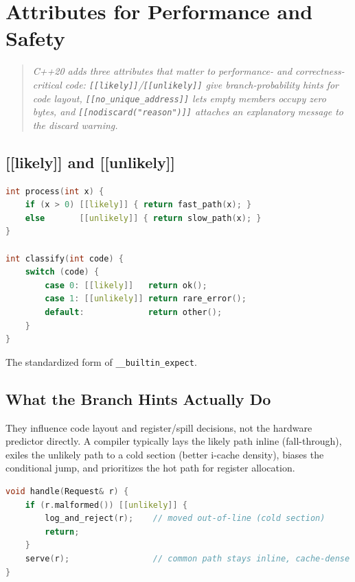 \chapter{Attributes for Performance and Safety}
\label{ch:c20-attributes}

\begin{quote}
\emph{C++20 adds three attributes that matter to performance- and correctness-critical code: \texttt{[[likely]]}/\texttt{[[unlikely]]} give branch-probability hints for code layout, \texttt{[[no\_unique\_address]]} lets empty members occupy zero bytes, and \texttt{[[nodiscard("reason")]]} attaches an explanatory message to the discard warning.}
\end{quote}

\section{[[likely]] and [[unlikely]]}
\label{sec:c20-likely}

\begin{lstlisting}[language=C++,caption={Branch-probability hints on if/else and switch}]
int process(int x) {
    if (x > 0) [[likely]] { return fast_path(x); }
    else       [[unlikely]] { return slow_path(x); }
}

int classify(int code) {
    switch (code) {
        case 0: [[likely]]   return ok();
        case 1: [[unlikely]] return rare_error();
        default:             return other();
    }
}
\end{lstlisting}

The standardized form of \texttt{\_\_builtin\_expect}.

\section{What the Branch Hints Actually Do}
\label{sec:c20-branch-hints-effect}

They influence code layout and register/spill decisions, not the hardware predictor directly. A compiler typically lays the likely path inline (fall-through), exiles the unlikely path to a cold section (better i-cache density), biases the conditional jump, and prioritizes the hot path for register allocation.

\begin{lstlisting}[language=C++,caption={The mental model --- cold paths get exiled}]
void handle(Request& r) {
    if (r.malformed()) [[unlikely]] {
        log_and_reject(r);    // moved out-of-line (cold section)
        return;
    }
    serve(r);                 // common path stays inline, cache-dense
}
\end{lstlisting}

